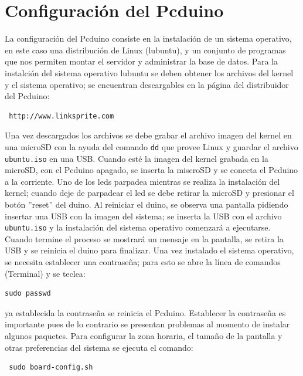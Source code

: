 \documentclass[10pt,twocolumn]{article}
\begin{document}
\section{Configuraci\'on del Pcduino}
La configuraci\'on del Pcduino consiste en la instalaci\'on de un sistema operativo, en este caso una distribuci\'on de Linux (lubuntu), y un conjunto 
de programas que nos permiten montar el servidor y administrar la base de datos. Para la instalci\'on del sistema operativo lubuntu se deben obtener los archivos del 
kernel y el sistema operativo; se encuentran descargables 
en la 
p\'agina del distribuidor del Pcduino: 
\begin{verbatim}
 http://www.linksprite.com 
\end{verbatim}
Una vez descargados los archivos se debe grabar el archivo imagen del kernel en una microSD con la ayuda 
del comando 
\verb|dd| que provee Linux y guardar el archivo \verb|ubuntu.iso| en una 
USB. Cuando est\'e la imagen del kernel grabada en la microSD, con el Pcduino apagado, se inserta la miscroSD y se conecta el Pcduino a la corriente. Uno de los leds 
parpadea mientras se realiza la instalaci\'on del kernel; cuando deje de parpadear el led se debe retirar la microSD y presionar el bot\'on ''reset'' del duino. Al 
reiniciar el duino, se observa una pantalla pidiendo insertar una USB con la imagen del sistema; se inserta la USB con el archivo \verb|ubuntu.iso| y la instalaci\'on 
del sistema operativo comenzar\'a a ejecutarse. Cuando termine el proceso se mostrar\'a un mensaje en la pantalla, se retira la USB y se reinicia el duino para 
finalizar. Una vez instalado el sistema operativo, se necesita establecer una 
contrase\~na; para esto se abre la l\'inea de comandos (Terminal) y se teclea:
\begin{verbatim}
sudo passwd
\end{verbatim}
ya establecida la contrase\~na se reinicia el Pcduino. Establecer la contrase\~na es importante pues de lo contrario se presentan problemas al momento de 
instalar algunos paquetes. Para configurar la zona horaria, el tama\~no de la pantalla y otras 
preferencias del sistema se ejecuta el comando:

\begin{verbatim}
 sudo board-config.sh 
\end{verbatim}
\end{document}
